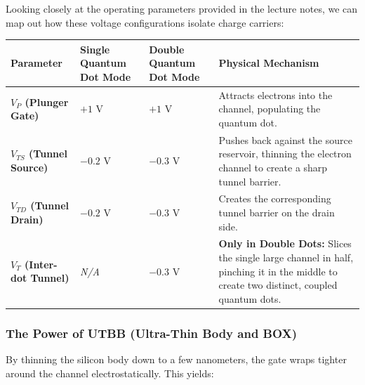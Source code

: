 \documentclass[
]{article}
\begin{document}
Looking closely at the operating parameters provided in the lecture
notes, we can map out how these voltage configurations isolate charge
carriers:

\begin{longtable}[]{@{}
  >{\raggedright\arraybackslash}p{}
  >{\raggedright\arraybackslash}p{}
  >{\raggedright\arraybackslash}p{}
  >{\raggedright\arraybackslash}p{}@{}}
\toprule\noalign{}
\begin{minipage}[b]{\linewidth}\raggedright
Parameter
\end{minipage} & \begin{minipage}[b]{\linewidth}\raggedright
Single Quantum Dot Mode
\end{minipage} & \begin{minipage}[b]{\linewidth}\raggedright
Double Quantum Dot Mode
\end{minipage} & \begin{minipage}[b]{\linewidth}\raggedright
Physical Mechanism
\end{minipage} \\
\midrule\noalign{}
\endhead
\bottomrule\noalign{}
\endlastfoot
\textbf{\(V_P\) (Plunger Gate)} & \(+1\text{ V}\) & \(+1\text{ V}\) &
Attracts electrons into the channel, populating the quantum dot. \\
\textbf{\(V_{TS}\) (Tunnel Source)} & \(-0.2\text{ V}\) &
\(-0.3\text{ V}\) & Pushes back against the source reservoir, thinning
the electron channel to create a sharp tunnel barrier. \\
\textbf{\(V_{TD}\) (Tunnel Drain)} & \(-0.2\text{ V}\) &
\(-0.3\text{ V}\) & Creates the corresponding tunnel barrier on the
drain side. \\
\textbf{\(V_T\) (Inter-dot Tunnel)} & \emph{N/A} & \(-0.3\text{ V}\) &
\textbf{Only in Double Dots:} Slices the single large channel in half,
pinching it in the middle to create two distinct, coupled quantum
dots. \\
\end{longtable}

\subsubsection{The Power of UTBB (Ultra-Thin Body and
BOX)}\label{the-power-of-utbb-ultra-thin-body-and-box}

By thinning the silicon body down to a few nanometers, the gate wraps
tighter around the channel electrostatically. This yields:
\end{document}

